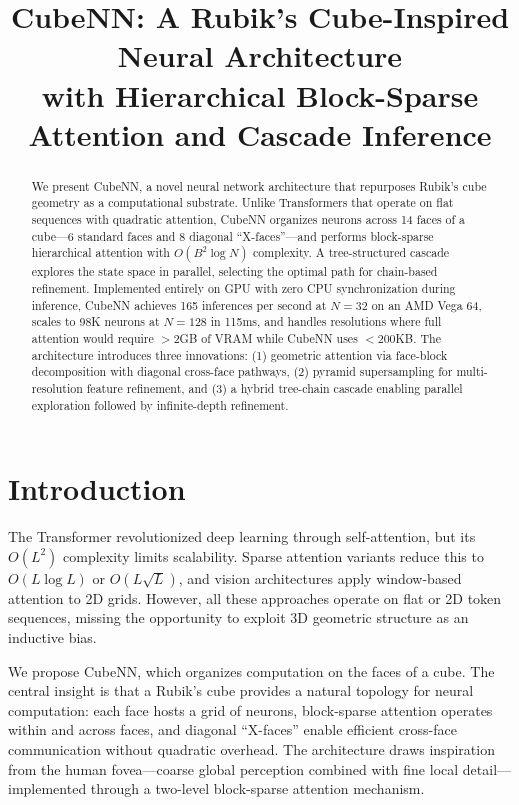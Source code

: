 \documentclass{article}
\begin{document}
\title{CubeNN: A Rubik's Cube-Inspired Neural Architecture \\ with Hierarchical Block-Sparse Attention and Cascade Inference}
\maketitle

\begin{abstract}
We present CubeNN, a novel neural network architecture that repurposes Rubik's cube geometry as a computational substrate. Unlike Transformers that operate on flat sequences with quadratic attention, CubeNN organizes neurons across 14 faces of a cube—6 standard faces and 8 diagonal ``X-faces''—and performs block-sparse hierarchical attention with $O(B^2 \log N)$ complexity. A tree-structured cascade explores the state space in parallel, selecting the optimal path for chain-based refinement. Implemented entirely on GPU with zero CPU synchronization during inference, CubeNN achieves 165 inferences per second at $N{=}32$ on an AMD Vega 64, scales to 98K neurons at $N{=}128$ in 115ms, and handles resolutions where full attention would require $>2$GB of VRAM while CubeNN uses $<200$KB. The architecture introduces three innovations: (1) geometric attention via face-block decomposition with diagonal cross-face pathways, (2) pyramid supersampling for multi-resolution feature refinement, and (3) a hybrid tree-chain cascade enabling parallel exploration followed by infinite-depth refinement.
\end{abstract}

\section{Introduction}

The Transformer \cite{vaswani2017attention} revolutionized deep learning through self-attention, but its $O(L^2)$ complexity limits scalability. Sparse attention variants \cite{child2019generating,beltagy2020longformer,zaheer2020bigbird} reduce this to $O(L \log L)$ or $O(L \sqrt{L})$, and vision architectures \cite{liu2021swin,dosovitskiy2020vit} apply window-based attention to 2D grids. However, all these approaches operate on flat or 2D token sequences, missing the opportunity to exploit 3D geometric structure as an inductive bias.

We propose CubeNN, which organizes computation on the faces of a cube. The central insight is that a Rubik's cube provides a natural topology for neural computation: each face hosts a grid of neurons, block-sparse attention operates within and across faces, and diagonal ``X-faces'' enable efficient cross-face communication without quadratic overhead. The architecture draws inspiration from the human fovea—coarse global perception combined with fine local detail—implemented through a two-level block-sparse attention mechanism.
\end{document}

